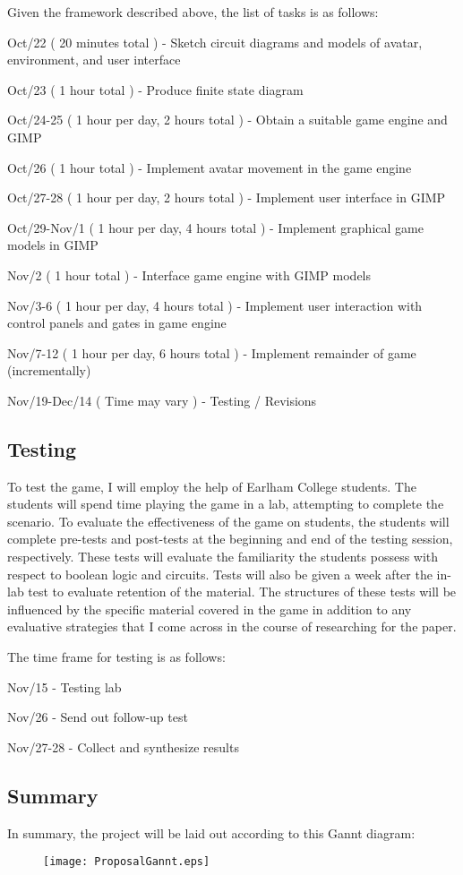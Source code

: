 \documentclass[11pt]{article}	%
\begin{document}
Given the framework described above, the list of tasks is as follows:

Oct/22 ( 20 minutes total ) - Sketch circuit diagrams and models of avatar, environment, and user interface

Oct/23 ( 1 hour total ) - Produce finite state diagram

Oct/24-25 ( 1 hour per day, 2 hours total ) - Obtain a suitable game engine and GIMP

Oct/26 ( 1 hour total ) - Implement avatar movement in the game engine

Oct/27-28 ( 1 hour per day, 2 hours total ) - Implement user interface in GIMP

Oct/29-Nov/1 ( 1 hour per day, 4 hours total ) - Implement graphical game models in GIMP

Nov/2 ( 1 hour total ) - Interface game engine with GIMP models

Nov/3-6 ( 1 hour per day, 4 hours total ) - Implement user interaction with control panels and gates in game engine

Nov/7-12 ( 1 hour per day, 6 hours total ) - Implement remainder of game (incrementally)

Nov/19-Dec/14 ( Time may vary ) - Testing / Revisions


\subsection*{Testing}

To test the game, I will employ the help of Earlham College students.  The students will spend time playing the game in a lab, attempting to complete the scenario.  To evaluate the effectiveness of the game on students, the students will complete pre-tests and post-tests at the beginning and end of the testing session, respectively.  These tests will evaluate the familiarity the students possess with respect to boolean logic and circuits.  Tests will also be given a week after the in-lab test to evaluate retention of the material.  The structures of these tests will be influenced by the specific material covered in the game in addition to any evaluative strategies that I come across in the course of researching for the paper.

The time frame for testing is as follows:

Nov/15 - Testing lab

Nov/26 - Send out follow-up test

Nov/27-28 - Collect and synthesize results

\subsection*{Summary}

In summary, the project will be laid out according to this Gannt diagram:
\begin{figure}[htb!]
\texttt{[image: ProposalGannt.eps]}
\end{figure}
\end{document}
